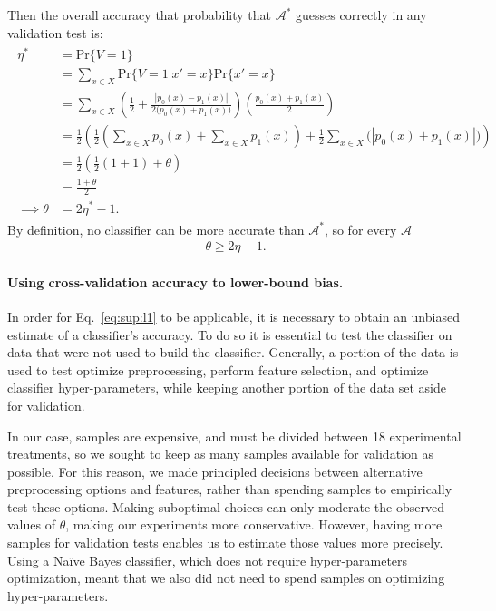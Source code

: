 \documentclass[12pt]{article}
\begin{document}
Then the overall accuracy that probability that $\mathcal{A^*}$ guesses correctly in 
any validation test is:
\begin{align}
	\begin{split}
	\eta^* &= \mathrm{Pr}\{V=1\} \\
		&=\sum_{x\in X} \mathrm{Pr}\{V = 1 | x' = x \} \mathrm{Pr}\{x' = x\}\\
		&= \sum_{x\in X} \left(
				\frac{1}{2} + 
				\frac{|p_0(x) - p_1(x)|}{2 \big(p_0(x) + p_1(x) \big)}
			\right)
			\left(
				\frac{p_0(x) + p_1(x)}{2}
			\right)\\
		&= \frac{1}{2}\left(
				\frac{1}{2}(
					\sum_{x \in X}p_0(x) + \sum_{x \in X}p_1(x)
				) + 
				\frac{1}{2} \sum_{x \in X} \big(|p_0(x) + p_1(x)|\big)
			\right) \\
		&= \frac{1}{2} \left( \frac{1}{2}(1 + 1) + \theta \right)\\
		&= \frac{1 + \theta}{2}\\
		\implies \theta &= 2\eta^* - 1.
	\end{split}
\end{align}
By definition, no classifier can be more accurate than $\mathcal{A^*}$, so
for every $\mathcal{A}$
\begin{align}
		\theta \geq 2\eta - 1.
\end{align}

\paragraph{Using cross-validation accuracy to lower-bound bias.}
	In order for Eq.~\ref{eq:sup:l1} to be applicable, it is necessary to 
	obtain an unbiased estimate of a classifier's accuracy.  To do so it is
	essential to test the classifier on data that were not used to build 
	the classifier.  Generally, a portion of the data is used to test
	optimize preprocessing, perform feature selection, and optimize 
	classifier hyper-parameters, while keeping another portion of the data
	set aside for validation.

	In our case, samples are expensive, and must be divided between 18
	experimental treatments, so we sought to keep as many samples available 
	for validation
	as possible.  For this reason, we made principled decisions 
	between alternative preprocessing options and features, 
	rather than spending samples to empirically test these options.  Making
	suboptimal choices can only moderate the observed values 
	of $\theta$, making our experiments more conservative. 
	However, having more samples for validation tests enables us to estimate
	those values more precisely.  
	Using a Na\"ive Bayes classifier, which does not require hyper-parameters 
	optimization, meant that we also did not need to spend samples on 
	optimizing hyper-parameters.  
	
\end{document}
